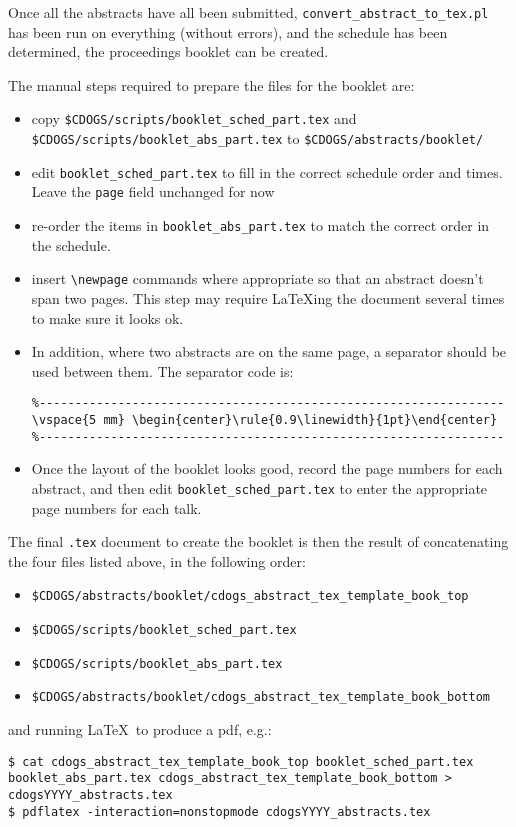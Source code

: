\documentclass[letterpaper,12pt]{article}
\begin{document}
Once all the abstracts have all been submitted,
\verb|convert_abstract_to_tex.pl| has been run on everything (without
errors), and the schedule has been determined, the proceedings booklet
can be created.

The manual steps required to prepare the files for the booklet are:
\begin{itemize}
\item copy \verb|$CDOGS/scripts/booklet_sched_part.tex| and
  \verb|$CDOGS/scripts/booklet_abs_part.tex| to
  \verb|$CDOGS/abstracts/booklet/|
\item edit \verb|booklet_sched_part.tex| to fill in the correct
  schedule order and times. Leave the \verb|page| field unchanged for
  now
\item re-order the items in \verb|booklet_abs_part.tex| to match the
  correct order in the schedule.
\item insert \verb|\newpage| commands where appropriate so that an
  abstract doesn't span two pages. This step may require \LaTeX ing
  the document several times to make sure it looks ok.
\item In addition, where two abstracts are on the same page, a
  separator should be used between them. The separator code is:
\begin{verbatim}
%-----------------------------------------------------------------
\vspace{5 mm} \begin{center}\rule{0.9\linewidth}{1pt}\end{center}
%-----------------------------------------------------------------
\end{verbatim}
\item Once the layout of the booklet looks good, record the page
  numbers for each abstract, and then edit
  \verb|booklet_sched_part.tex| to enter the appropriate page numbers
  for each talk.
\end{itemize}

The final \verb|.tex| document to create the booklet is then the result of
concatenating the four files listed above, in the following order:
\begin{itemize}
\item \verb|$CDOGS/abstracts/booklet/cdogs_abstract_tex_template_book_top|
\item \verb|$CDOGS/scripts/booklet_sched_part.tex|
\item \verb|$CDOGS/scripts/booklet_abs_part.tex|
\item \verb|$CDOGS/abstracts/booklet/cdogs_abstract_tex_template_book_bottom|
\end{itemize}
and running \LaTeX\ to produce a pdf, e.g.:
\begin{verbatim}
$ cat cdogs_abstract_tex_template_book_top booklet_sched_part.tex
booklet_abs_part.tex cdogs_abstract_tex_template_book_bottom >
cdogsYYYY_abstracts.tex
$ pdflatex -interaction=nonstopmode cdogsYYYY_abstracts.tex
\end{verbatim}
\end{document}
